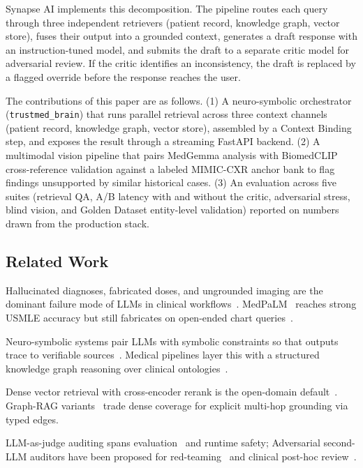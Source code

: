 \documentclass[twocolumn,10pt,main=USenglish]{asmeconf}
\begin{document}
Synapse AI implements this decomposition. The pipeline routes each
query through three independent retrievers (patient record,
knowledge graph, vector store), fuses their output into a grounded
context, generates a draft response with an instruction-tuned model,
and submits the draft to a separate critic model for adversarial
review. If the critic identifies an inconsistency, the draft is
replaced by a flagged override before the response reaches the user.

The contributions of this paper are as follows.
(1) A neuro-symbolic orchestrator (\texttt{trustmed\_brain}) that
runs parallel retrieval across three context channels (patient
record, knowledge graph, vector store), assembled by a Context
Binding step, and exposes the result through a streaming FastAPI
backend.
(2) A multimodal vision pipeline that pairs MedGemma analysis with
BiomedCLIP cross-reference validation against a labeled MIMIC-CXR
anchor bank to flag findings unsupported by similar historical
cases.
(3) An evaluation across five suites (retrieval QA, A/B latency
with and without the critic, adversarial stress, blind vision, and
Golden Dataset entity-level validation) reported on numbers drawn
from the production stack.

\subsection{Related Work}
\label{sec:related}

Hallucinated diagnoses,
fabricated doses, and ungrounded imaging are the dominant failure
mode of LLMs in clinical workflows~\cite{ji2023survey,
pal2023medhalt}. MedPaLM~\cite{singhal2023large} reaches strong
USMLE accuracy but still fabricates on open-ended chart
queries~\cite{omiye2023racial}.

Neuro-symbolic systems pair LLMs with symbolic constraints so that
outputs trace to verifiable sources~\cite{sheth2023neurosymbolic}.
Medical pipelines layer this with a structured knowledge graph
reasoning over clinical ontologies~\cite{rotmensch2017graph}.

Dense vector retrieval with cross-encoder rerank is the open-domain
default~\cite{lewis2020rag, reimers2019sbert}. Graph-RAG
variants~\cite{edge2024local} trade dense coverage for explicit
multi-hop grounding via typed edges.

LLM-as-judge auditing
spans evaluation~\cite{zheng2023judge} and runtime safety;
Adversarial second-LLM auditors have been proposed for
red-teaming~\cite{perez2022red} and clinical post-hoc
review~\cite{karabacak2023mirroring}.
\end{document}
